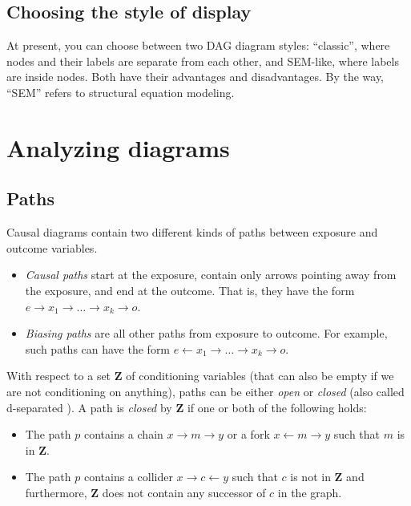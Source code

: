 \documentclass[a4paper]{article} %
\begin{document}
\subsection{Choosing the style of display}

At present, you can choose between two DAG diagram styles: ``classic'', where nodes and
their labels are separate from each other, and SEM-like, where labels are inside nodes. 
Both have their advantages and disadvantages. By the way, ``SEM'' refers to structural
equation modeling.

\section{Analyzing diagrams}

\label{sec:diagramanalysis}

\subsection{Paths}

Causal diagrams contain two different kinds of paths between exposure and outcome
variables.

\begin{itemize}
\item \emph{Causal paths} start at the exposure, contain
only arrows pointing away from the exposure, and end at 
the outcome. That is, they have the form
$e \rightarrow x_1 \rightarrow \ldots \rightarrow x_k \rightarrow o$.
\item \emph{Biasing paths} are all other paths from exposure to outcome. For 
example, such paths can have the form 
$e \leftarrow x_1 \rightarrow \ldots \rightarrow x_k \rightarrow o$.
\end{itemize}

With respect to a set $\mathbf{Z}$ of conditioning variables (that 
can also be empty if we are not conditioning on anything), 
paths can be either \emph{open} or \emph{closed}
(also called d-separated \cite{Pearl2009}). A path 
is \emph{closed} by $\mathbf{Z}$ if one or both of the following holds: 

\begin{itemize}
 \item The path $p$ contains a chain $x \rightarrow m \rightarrow y$ 
 	or a fork $x \leftarrow m \rightarrow y$ 
    such that $m$ is in $\mathbf{Z}$.
 \item The path $p$ contains a collider $x \rightarrow c \leftarrow y$ 
 	such that $c$ is not in $\mathbf{Z}$ and 
    furthermore, $\mathbf{Z}$ does not contain
    any successor of $c$ in the graph. 
\end{itemize}
\end{document}
